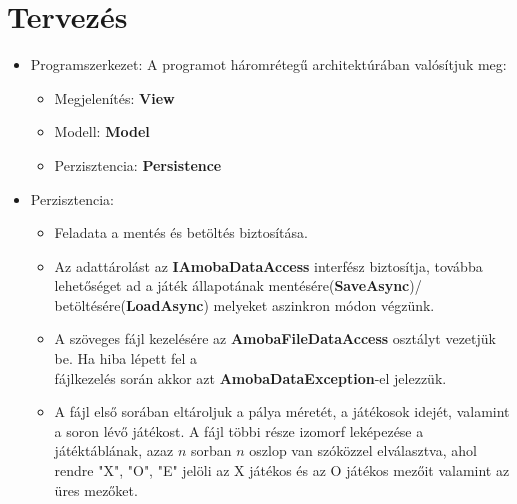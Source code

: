 \documentclass[11pt,a4paper]{article}
\begin{document}
\section{Tervezés}
\begin{itemize}
	\item Programszerkezet: A programot háromrétegű architektúrában valósítjuk meg:
	\begin{itemize}
		\item Megjelenítés: \textbf{View}
		\item Modell: \textbf{Model}
		\item Perzisztencia: \textbf{Persistence}
	\end{itemize}
	\item Perzisztencia:
	\begin{itemize}
		\item Feladata a mentés és betöltés biztosítása.
		\item Az adattárolást az \textbf{IAmobaDataAccess} interfész biztosítja, továbba
		lehetőséget ad a játék állapotának mentésére(\textbf{SaveAsync})/
		betöltésére(\textbf{LoadAsync})	melyeket aszinkron módon végzünk.
		\item A szöveges fájl kezelésére az \textbf{AmobaFileDataAccess} osztályt vezetjük be.
		Ha hiba lépett fel a\\fájlkezelés során akkor azt \textbf{AmobaDataException}-el jelezzük.
		\item A fájl első sorában eltároljuk a pálya méretét, a játékosok idejét, valamint
		a soron lévő játékost. A fájl többi része izomorf leképezése a játéktáblának, azaz
		$n$ sorban $n$ oszlop van szóközzel elválasztva, ahol rendre "X", "O", "E" jelöli
		az X játékos és az O játékos mezőit valamint az üres mezőket.
	\end{itemize}
\end{itemize}
\end{document}
